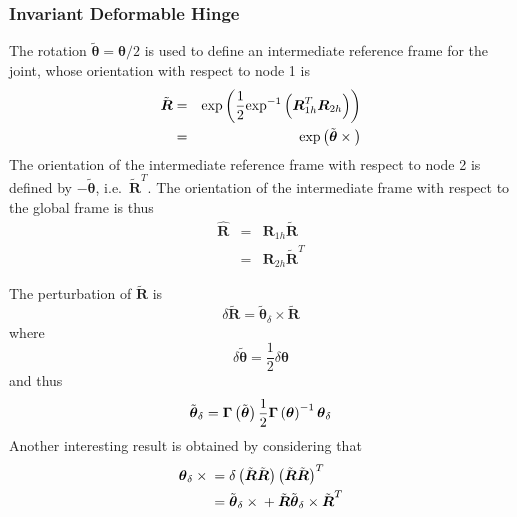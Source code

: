 \documentclass[10pt,dvips,fleqn]{report}
\newcommand{\T}[1]{\boldsymbol{#1}}
\begin{document}
\subsubsection{Invariant Deformable Hinge}
\label{sec:deformable-hinge-invariant}
The rotation $\tilde{\T{\theta}}=\T{\theta}/2$
is used to define an intermediate reference frame for the joint,
whose orientation with respect to node 1 is
\begin{eqnarray}
	\tilde{\T{R}} & = & \llk{exp}\plbr{\frac{1}{2}\llk{exp}^{-1}\plbr{\T{R}_{1h}^T \T{R}_{2h}}} \\
		& = & \llk{exp}\plbr{\tilde{\T{\theta}}\times{}}
\end{eqnarray}
The orientation of the intermediate reference frame with respect 
to node 2 is defined by $-\tilde{\T{\theta}}$, i.e.\ $\tilde{\T{R}}^T$.
The orientation of the intermediate frame with respect
to the global frame is thus
\begin{eqnarray}
	\hat{\T{R}} & = & \T{R}_{1h} \tilde{\T{R}} \\
	& = & \T{R}_{2h} \tilde{\T{R}}^T
\end{eqnarray}
\begin{comment}
The derivative of $\tilde{\T{R}}$ is
\begin{equation}
	\dot{\tilde{\T{R}}} = \frac{1}{2}\plbr{\T{\omega}_2 - \T{\omega}_1}\times\tilde{\T{R}}
\end{equation}
and the derivative of $\hat{\T{R}}$ is
\begin{equation}
	\dot{\hat{\T{R}}} = \frac{1}{2}\plbr{\T{\omega}_1 + \T{\omega}_2}\times\hat{\T{R}}
\end{equation}
\end{comment}
The perturbation of $\tilde{\T{R}}$ is
\begin{equation}
	\delta\tilde{\T{R}} = \tilde{\T{\theta}}_{\delta}\times\tilde{\T{R}}
\end{equation}
where
\begin{equation}
	\delta\tilde{\T{\theta}} = \frac{1}{2} \delta \T{\theta}
\end{equation}
and thus
\begin{equation}
	\tilde{\T{\theta}}_{\delta} = \T{\Gamma}\plbr{\tilde{\T{\theta}}} \frac{1}{2} \T{\Gamma}\plbr{\T{\theta}}^{-1} \T{\theta}_{\delta} 
\end{equation}
Another interesting result is obtained by considering that
\begin{align}
	\T{\theta}_{\delta} \times{}
	&= \delta\plbr{\tilde{\T{R}}\tilde{\T{R}}} \plbr{\tilde{\T{R}}\tilde{\T{R}}}^T \\
	&= \tilde{\T{\theta}}_{\delta} \times{} + \tilde{\T{R}} \tilde{\T{\theta}}_{\delta} \times \tilde{\T{R}}^T
\end{align}
\end{document}
